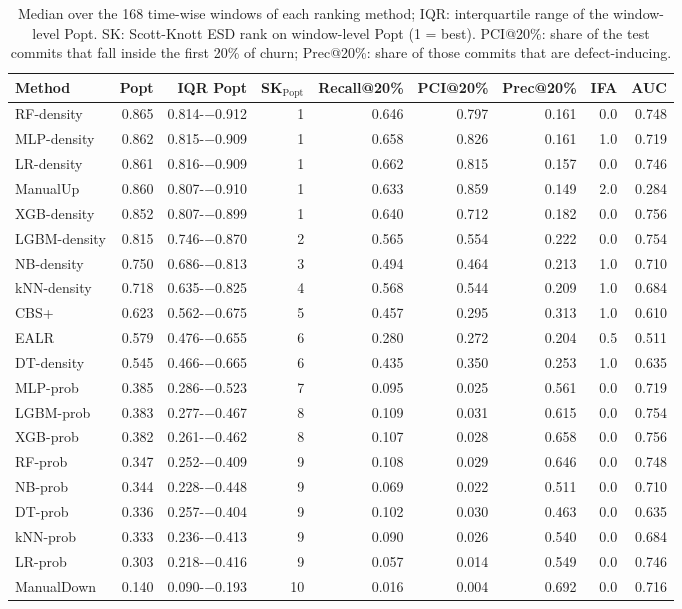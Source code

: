 \begin{table}[t]
\centering
\footnotesize
\caption{Median over the 168 time-wise windows of each ranking method; IQR: interquartile range of the window-level Popt. SK: Scott-Knott ESD rank on window-level Popt (1 = best). PCI@20\%: share of the test commits that fall inside the first 20\% of churn; Prec@20\%: share of those commits that are defect-inducing.}
\label{tab:p2-methods}
\begin{adjustbox}{max width=\linewidth}
\begin{tabular}{lrrrrrrrr}
\toprule
Method & Popt & IQR Popt & SK$_{\mathrm{Popt}}$ & Recall@20\% & PCI@20\% & Prec@20\% & IFA & AUC \\
\midrule
RF-density & 0.865 & 0.814-$-$0.912 & 1 & 0.646 & 0.797 & 0.161 & 0.0 & 0.748 \\
MLP-density & 0.862 & 0.815-$-$0.909 & 1 & 0.658 & 0.826 & 0.161 & 1.0 & 0.719 \\
LR-density & 0.861 & 0.816-$-$0.909 & 1 & 0.662 & 0.815 & 0.157 & 0.0 & 0.746 \\
ManualUp & 0.860 & 0.807-$-$0.910 & 1 & 0.633 & 0.859 & 0.149 & 2.0 & 0.284 \\
XGB-density & 0.852 & 0.807-$-$0.899 & 1 & 0.640 & 0.712 & 0.182 & 0.0 & 0.756 \\
LGBM-density & 0.815 & 0.746-$-$0.870 & 2 & 0.565 & 0.554 & 0.222 & 0.0 & 0.754 \\
NB-density & 0.750 & 0.686-$-$0.813 & 3 & 0.494 & 0.464 & 0.213 & 1.0 & 0.710 \\
kNN-density & 0.718 & 0.635-$-$0.825 & 4 & 0.568 & 0.544 & 0.209 & 1.0 & 0.684 \\
CBS+ & 0.623 & 0.562-$-$0.675 & 5 & 0.457 & 0.295 & 0.313 & 1.0 & 0.610 \\
EALR & 0.579 & 0.476-$-$0.655 & 6 & 0.280 & 0.272 & 0.204 & 0.5 & 0.511 \\
DT-density & 0.545 & 0.466-$-$0.665 & 6 & 0.435 & 0.350 & 0.253 & 1.0 & 0.635 \\
MLP-prob & 0.385 & 0.286-$-$0.523 & 7 & 0.095 & 0.025 & 0.561 & 0.0 & 0.719 \\
LGBM-prob & 0.383 & 0.277-$-$0.467 & 8 & 0.109 & 0.031 & 0.615 & 0.0 & 0.754 \\
XGB-prob & 0.382 & 0.261-$-$0.462 & 8 & 0.107 & 0.028 & 0.658 & 0.0 & 0.756 \\
RF-prob & 0.347 & 0.252-$-$0.409 & 9 & 0.108 & 0.029 & 0.646 & 0.0 & 0.748 \\
NB-prob & 0.344 & 0.228-$-$0.448 & 9 & 0.069 & 0.022 & 0.511 & 0.0 & 0.710 \\
DT-prob & 0.336 & 0.257-$-$0.404 & 9 & 0.102 & 0.030 & 0.463 & 0.0 & 0.635 \\
kNN-prob & 0.333 & 0.236-$-$0.413 & 9 & 0.090 & 0.026 & 0.540 & 0.0 & 0.684 \\
LR-prob & 0.303 & 0.218-$-$0.416 & 9 & 0.057 & 0.014 & 0.549 & 0.0 & 0.746 \\
ManualDown & 0.140 & 0.090-$-$0.193 & 10 & 0.016 & 0.004 & 0.692 & 0.0 & 0.716 \\
\bottomrule
\end{tabular}
\end{adjustbox}
\end{table}

